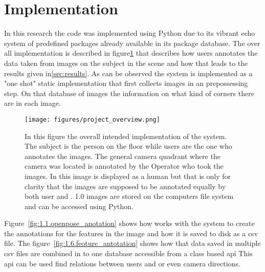 \section{Implementation}
\label{sec:work}

In this research the code was implemented using Python due to its vibrant echo system of predefined packages already available in its package database.
The over all implementation is described in figure\ref{fig:project_overview} that describes how users annotates the data taken from images on the subject in the scene and how that leads to the results given in\ref{sec:results}.
As can be observed the system is implemented  as a "one shot" static implementation that first collects images in an prepossessing step.
On that database of images the information on what kind of corners there are in each image.


\begin{figure}[ht]
\begin{center}
    \texttt{[image: figures/project\_overview.png]}
\end{center}
\caption{In this figure the overall intended implementation of the system. The subject is the person on the floor while users are the one who annotates the images. The general camera quadrant where the camera was located is annotated by the Operator who took the images. In this image \openpose is displayed as a human but that is only for clarity that the images are supposed to be annotated equally by both user and \openpose. 1.0 images are stored on the computers file system and can be accessed using Python.}
\label{fig:project_overview}
\end{figure}

Figure~\ref{fig:1.1.openpose_anotation} shows how \openpose works with the system to create the annotations for the features in the image and how it is saved to disk as a \ac{csv} file.
The figure~\ref{fig:1.6.feoture_antotation} shows how that data saved in multiple \ac{csv} files are combined in to one database accessible from a class based \ac{api}
This \ac{api} can be used find relations between users and \openpose or even camera directions.

